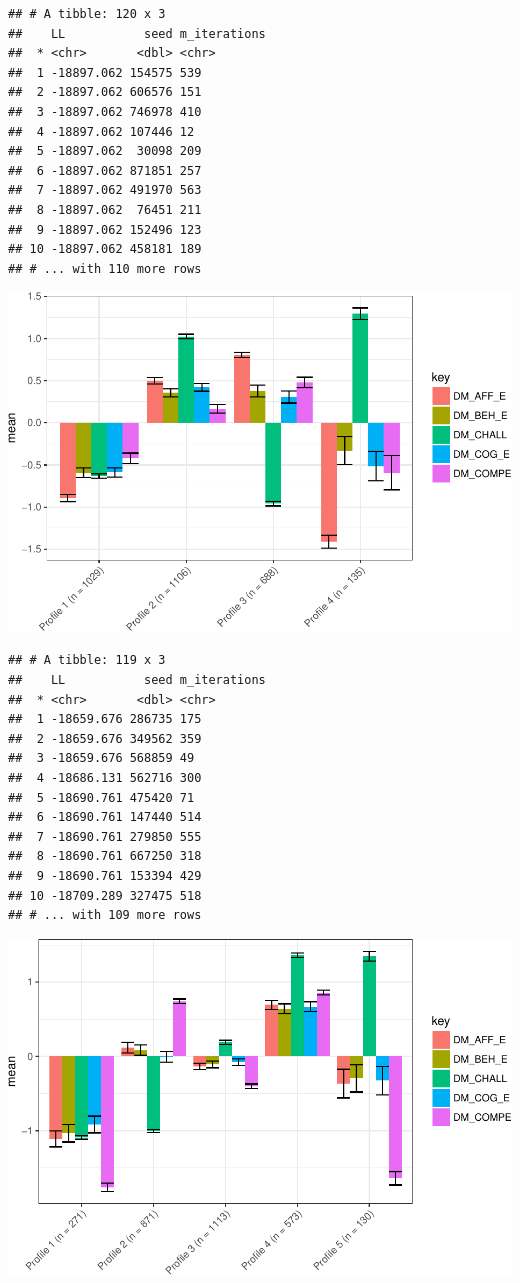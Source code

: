 \documentclass[]{book}
\theoremstyle{definition}
\theoremstyle{definition}
\theoremstyle{definition}
\theoremstyle{remark}
\begin{document}
\begin{verbatim}
## # A tibble: 120 x 3
##    LL           seed m_iterations
##  * <chr>       <dbl> <chr>       
##  1 -18897.062 154575 539         
##  2 -18897.062 606576 151         
##  3 -18897.062 746978 410         
##  4 -18897.062 107446 12          
##  5 -18897.062  30098 209         
##  6 -18897.062 871851 257         
##  7 -18897.062 491970 563         
##  8 -18897.062  76451 211         
##  9 -18897.062 152496 123         
## 10 -18897.062 458181 189         
## # ... with 110 more rows
\end{verbatim}

\includegraphics{rosenberg-dissertation_files/figure-latex/spec-solutions-model2-4-1.pdf}

\begin{verbatim}
## # A tibble: 119 x 3
##    LL           seed m_iterations
##  * <chr>       <dbl> <chr>       
##  1 -18659.676 286735 175         
##  2 -18659.676 349562 359         
##  3 -18659.676 568859 49          
##  4 -18686.131 562716 300         
##  5 -18690.761 475420 71          
##  6 -18690.761 147440 514         
##  7 -18690.761 279850 555         
##  8 -18690.761 667250 318         
##  9 -18690.761 153394 429         
## 10 -18709.289 327475 518         
## # ... with 109 more rows
\end{verbatim}

\includegraphics{rosenberg-dissertation_files/figure-latex/spec-solutions-model2-5-1.pdf}
\end{document}
